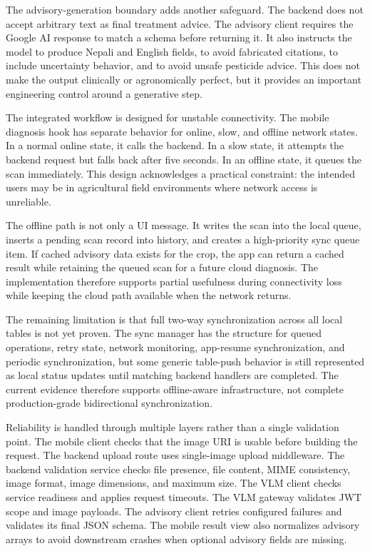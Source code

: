 The advisory-generation boundary adds another safeguard. The backend does not accept arbitrary
text as final treatment advice. The advisory client requires the Google AI response to match a
schema before returning it. It also instructs the model to produce Nepali and English fields, to
avoid fabricated citations, to include uncertainty behavior, and to avoid unsafe pesticide advice.
This does not make the output clinically or agronomically perfect, but it provides an important
engineering control around a generative step.


The integrated workflow is designed for unstable connectivity. The mobile diagnosis hook has
separate behavior for online, slow, and offline network states. In a normal online state, it calls
the backend. In a slow state, it attempts the backend request but falls back after five seconds. In
an offline state, it queues the scan immediately. This design acknowledges a practical constraint:
the intended users may be in agricultural field environments where network access is unreliable.

The offline path is not only a UI message. It writes the scan into the local queue, inserts a
pending scan record into history, and creates a high-priority sync queue item. If cached advisory
data exists for the crop, the app can return a cached result while retaining the queued scan for a
future cloud diagnosis. The implementation therefore supports partial usefulness during
connectivity loss while keeping the cloud path available when the network returns.

The remaining limitation is that full two-way synchronization across all local tables is not yet
proven. The sync manager has the structure for queued operations, retry state, network monitoring,
app-resume synchronization, and periodic synchronization, but some generic table-push behavior is
still represented as local status updates until matching backend handlers are completed. The
current evidence therefore supports offline-aware infrastructure, not complete production-grade
bidirectional synchronization.


Reliability is handled through multiple layers rather than a single validation point. The mobile
client checks that the image URI is usable before building the request. The backend upload route
uses single-image upload middleware. The backend validation service checks file presence, file
content, MIME consistency, image format, image dimensions, and maximum size. The VLM client checks
service readiness and applies request timeouts. The VLM gateway validates JWT scope and image
payloads. The advisory client retries configured failures and validates its final JSON schema.
The mobile result view also normalizes advisory arrays to avoid downstream crashes when optional
advisory fields are missing.

